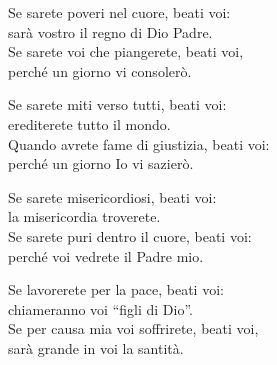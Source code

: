 

\spazio

\strofa Se sarete poveri nel cuore, beati voi:\\
sarà vostro il regno di Dio Padre.\\
Se sarete voi che piangerete, beati voi,\\
perché un giorno vi consolerò.

\spazio


\spazio

\strofa Se sarete miti verso tutti, beati voi:\\
erediterete tutto il mondo.\\
Quando avrete fame di giustizia, beati voi:\\
perché un giorno Io vi sazierò.

\spazio


\spazio

\strofa Se sarete misericordiosi, beati voi:\\
la misericordia troverete.\\
Se sarete puri dentro il cuore, beati voi:\\
perché voi vedrete il Padre mio.

\spazio


\spazio

\strofa Se lavorerete per la pace, beati voi:\\
chiameranno voi ``figli di Dio''.\\
Se per causa mia voi soffrirete, beati voi,\\
sarà grande in voi la santità.

\spazio


